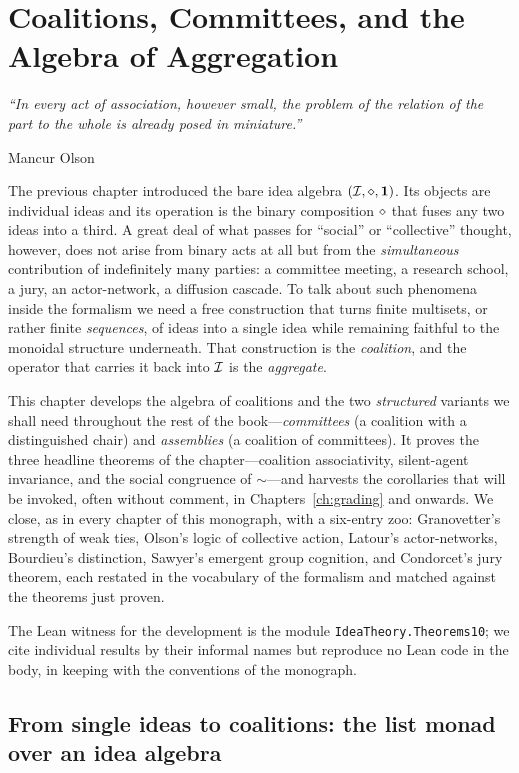 \chapter{Coalitions, Committees, and the Algebra of Aggregation}\label{ch:coalitions}

\epigraph{\itshape ``In every act of association, however small, the
problem of the relation of the part to the whole is already posed in
miniature.''}{Mancur Olson \cite{Olson1965}}

The previous chapter introduced the bare idea algebra
$(\mathcal{I},\mathbin{\diamond},\mathbf{1})$. Its objects are individual ideas and its operation is the
binary composition $\mathbin{\diamond}$ that fuses any two ideas into a third.
A great deal of what passes for ``social'' or ``collective'' thought,
however, does not arise from binary acts at all but from the
\emph{simultaneous} contribution of indefinitely many parties: a
committee meeting, a research school, a jury, an actor-network, a
diffusion cascade. To talk about such phenomena inside the formalism
we need a free construction that turns finite multisets, or rather
finite \emph{sequences}, of ideas into a single idea while remaining
faithful to the monoidal structure underneath. That construction is
the \emph{coalition}, and the operator that carries it back into
$\mathcal{I}$ is the \emph{aggregate}.

This chapter develops the algebra of coalitions and the two
\emph{structured} variants we shall need throughout the rest of the
book---\emph{committees} (a coalition with a distinguished chair) and
\emph{assemblies} (a coalition of committees). It proves the three
headline theorems of the chapter---coalition associativity, silent-agent
invariance, and the social congruence of $\sim$---and harvests the
corollaries that will be invoked, often without comment, in
Chapters~\ref{ch:grading} and onwards. We close, as in every chapter
of this monograph, with a six-entry zoo: Granovetter's strength of
weak ties, Olson's logic of collective action, Latour's
actor-networks, Bourdieu's distinction, Sawyer's emergent group
cognition, and Condorcet's jury theorem, each restated in the
vocabulary of the formalism and matched against the theorems just
proven.

The Lean witness for the development is the module
\texttt{IdeaTheory.Theorems10}; we cite individual results by their
informal names but reproduce no Lean code in the body, in keeping
with the conventions of the monograph.

\section{From single ideas to coalitions: the list monad over an idea algebra}
\label{sec:single-to-coalitions}

